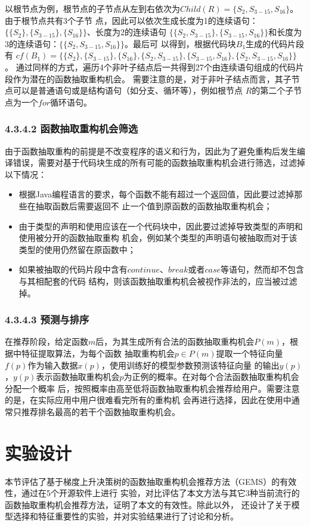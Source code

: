以根节点为例，根节点的子节点从左到右依次为$Child(R)=\{S_2,S_{3-15},S_{16}\}$。由于根节点共有3个子节
点，因此可以依次生成长度为1的连续语句：$\{\{S_2\},\{S_{3-15}\},\{S_{16}\}\}$、长度为2的连续语句
$\{\{S_2,S_{3-15}\},\{S_{3-15},S_{16}\}\}$和长度为3的连续语句：$\{\{S_2,S_{3-15},S_{16}\}\}$。最后可
以得到，根据代码块$B_1$生成的代码片段有
$cf(B_1)=\{\{S_2\},\{S_{3-15}\},\{S_{16}\},\{S_2,S_{3-15}\},\{S_{3-15},S_{16}\},\{S_2,S_{3-15},S_{16}\}\}$。
通过同样的方式，遍历4个非叶子结点后一共得到27个由连续语句组成的代码片段作为潜在的函数抽取重构机会。
需要注意的是，对于非叶子结点而言，其子节点可以是普通语句或是结构语句（如分支、循环等），例如根节点
$R$的第二个子节点为一个$for$循环语句。

\subsubsection{4.3.4.2 函数抽取重构机会筛选}
由于函数抽取重构的前提是不改变程序的语义和行为，因此为了避免重构后发生编译错误，需要对基于代码块生成的所有可能的函数抽取重构机会进行筛选，过滤掉以下情况：
\begin{itemize}
  \item 根据Java编程语言的要求，每个函数不能有超过一个返回值，因此要过滤掉那些在抽取函数后需要返回不
  止一个值到原函数的函数抽取重构机会；
  \item 由于类型的声明和使用应该在一个代码块中，因此要过滤掉导致类型的声明和使用被分开的函数抽取重构
  机会，例如某个类型的声明语句被抽取而对于该类型的使用仍然留在原函数中；
  \item 如果被抽取的代码片段中含有$continue$、$break$或者$case$等语句，然而却不包含与其相配套的代码
  结构，则该函数抽取重构机会被视作非法的，应当被过滤掉。
\end{itemize}

\subsubsection{4.3.4.3 预测与排序}
在推荐阶段，给定函数$m$后，为其生成所有合法的函数抽取重构机会$P(m)$，根据中特征提取算法，为每个函数
抽取重构机会$p\in P(m)$提取一个特征向量$f(p)$作为输入数据$x(p)$，使用训练好的模型参数预测该特征向量
的输出$y(p)$，$y(p)$表示函数抽取重构机会$p$为正例的概率。在对每个合法函数抽取重构机会分配一个概率
后，按照概率由高至低将函数抽取重构机会推荐给用户。需要注意的是，在实际应用中用户很难看完所有的重构机
会再进行选择，因此在使用中通常只推荐排名最高的若干个函数抽取重构机会。

\section{实验设计}
本节评估了基于梯度上升决策树的函数抽取重构机会推荐方法（GEMS）的有效性，通过在5个开源软件上进行
实验，对比评估了本文方法与其它3种当前流行的函数抽取重构机会推荐方法，证明了本文的有效性。除此以外，
还设计了关于模型选择和特征重要性的实验，并对实验结果进行了讨论和分析。

